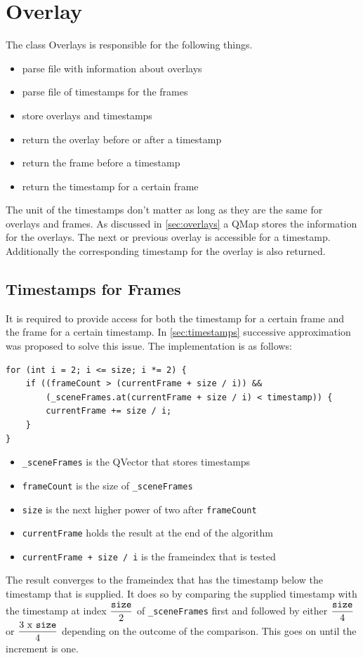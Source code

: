 \section{Overlay}
\label{sec:overlayClass}
The class Overlays is responsible for the following things.
\begin{itemize}
	\item parse file with information about overlays
	\item parse file of timestamps for the frames
	\item store overlays and timestamps
	\item return the overlay before or after a timestamp
	\item return the frame before a timestamp
	\item return the timestamp for a certain frame
\end{itemize}
The unit of the timestamps don't matter as long as they are the same for overlays and frames. 
As discussed in \ref{sec:overlays} a QMap stores the information for the overlays. The next or previous overlay is accessible for a timestamp. Additionally the corresponding timestamp for the overlay is also returned.
\subsection{Timestamps for Frames}
\label{sec:timestampsForFrames}
It is required to provide access for both the timestamp for a certain frame and the frame for a certain timestamp. In \ref{sec:timestamps} successive approximation was proposed to solve this issue. The implementation is as follows:

\begin{lstlisting}
for (int i = 2; i <= size; i *= 2) {
	if ((frameCount > (currentFrame + size / i)) &&
		(_sceneFrames.at(currentFrame + size / i) < timestamp)) {
		currentFrame += size / i;
	}
}
\end{lstlisting}
\begin{itemize}
	\item \texttt{\_sceneFrames} is the QVector that stores timestamps
	\item \texttt{frameCount} is the size of \texttt{\_sceneFrames}
	\item \texttt{size} is the next higher power of two after \texttt{frameCount}
	\item \texttt{currentFrame} holds the result at the end of the algorithm
	\item \texttt{currentFrame + size / i} is the frameindex that is tested
\end{itemize}
The result converges to the frameindex that has the timestamp below the timestamp that is supplied. It does so by comparing the supplied timestamp with the timestamp at index $\displaystyle\frac{\mbox{\texttt{size}}}{\mbox{2}}$ of \texttt{\_sceneFrames} first and followed by either $\displaystyle\frac{\mbox{\texttt{size}}}{\mbox{4}}$ or $\displaystyle\frac{\mbox{3 x \texttt{size}}}{\mbox{4}}$ depending on the outcome of the comparison. This goes on until the increment is one.

